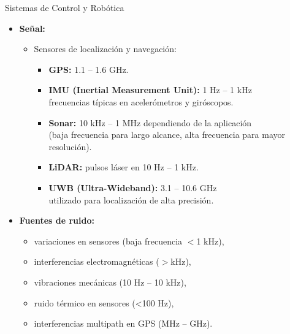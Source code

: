 \documentclass{beamer}
\numberwithin{section}{part}
\begin{document}
\begin{frame}{Sistemas de Control y Robótica}
    \begin{itemize}
        \item \textbf{Señal:}
        \begin{itemize}
            \item Sensores de localización y navegación:
            \begin{itemize}
                \item \textbf{GPS:} 1.1 – 1.6 GHz.
                \item \textbf{IMU (Inertial Measurement Unit):} 1 Hz – 1 kHz\\frecuencias típicas en acelerómetros y giróscopos.
                \item \textbf{Sonar:} 10 kHz – 1 MHz dependiendo de la aplicación\\ (baja frecuencia para largo alcance, alta frecuencia para mayor resolución).
                \item \textbf{LiDAR:} pulsos láser en 10 Hz – 1 kHz.
                \item \textbf{UWB (Ultra-Wideband):} 3.1 – 10.6 GHz\\utilizado para localización de alta precisión.
            \end{itemize}
        \end{itemize}
        \item \textbf{Fuentes de ruido:}
        \begin{itemize}
            \item variaciones en sensores (baja frecuencia $<$1 kHz),
            \item interferencias electromagnéticas ($>$kHz),
            \item vibraciones mecánicas (10 Hz – 10 kHz),
            \item ruido térmico en sensores (<100 Hz),
            \item interferencias multipath en GPS (MHz – GHz).
        \end{itemize}
    \end{itemize}
\end{frame}
\end{document}
